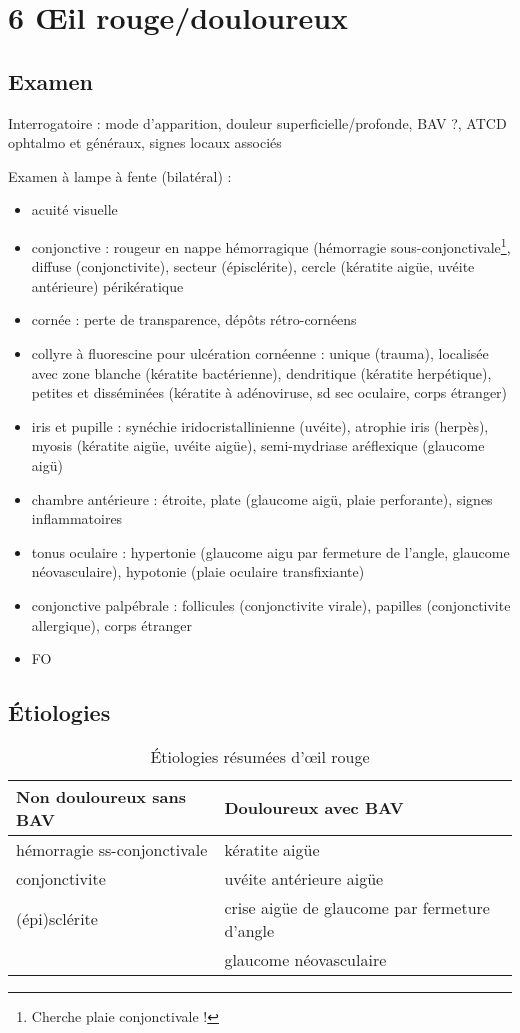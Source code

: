 \documentclass[11pt]{article}
\begin{document}
\section{6 \OE{}il rouge/douloureux}
\label{sec:orga846920}
\subsection{Examen}
\label{sec:orgaef5391}
Interrogatoire : mode d'apparition, douleur superficielle/profonde, BAV
   ?, ATCD ophtalmo et généraux, signes locaux associés

Examen à lampe à fente (bilatéral) :
\begin{itemize}
\item acuité visuelle
\item conjonctive : rougeur en nappe hémorragique (hémorragie
sous-conjonctivale\footnote{Cherche plaie conjonctivale !}, diffuse (conjonctivite), secteur (épisclérite),
cercle (kératite aigüe, uvéite antérieure)
périkératique
\item cornée : perte de transparence, dépôts rétro-cornéens
\item collyre à fluorescine pour ulcération cornéenne : unique (trauma), localisée
avec zone blanche (kératite bactérienne), dendritique (kératite herpétique),
petites et disséminées (kératite à adénoviruse, sd sec oculaire, corps
étranger)
\item iris et pupille : synéchie iridocristallinienne (uvéite), atrophie iris
(herpès), myosis (kératite aigüe, uvéite aigüe), semi-mydriase
aréflexique (glaucome aigü)
\item chambre antérieure : étroite, plate (glaucome aigü, plaie perforante), signes inflammatoires
\item tonus oculaire : hypertonie (glaucome aigu par fermeture de l'angle, glaucome
néovasculaire), hypotonie (plaie oculaire transfixiante)
\item conjonctive palpébrale : follicules (conjonctivite virale), papilles
(conjonctivite allergique), corps étranger
\item FO
\end{itemize}

\subsection{Étiologies}
\label{sec:org906cbef}

\begin{table}[htbp]
\caption{Étiologies résumées d'\oe{}il rouge}
\centering
\begin{tabular}{ll}
\toprule
Non douloureux sans BAV & Douloureux avec BAV\\
\midrule
hémorragie ss-conjonctivale & kératite aigüe\\
conjonctivite & uvéite antérieure aigüe\\
(épi)sclérite & crise aigüe de glaucome par fermeture d'angle\\
 & glaucome néovasculaire\\
\bottomrule
\end{tabular}
\end{table}
\end{document}
